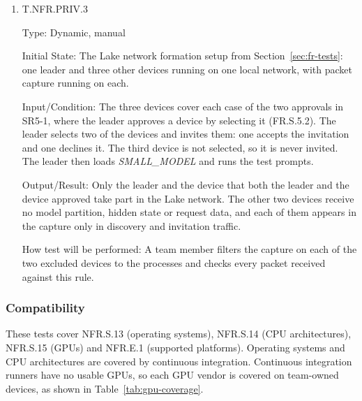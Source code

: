 \documentclass[12pt, titlepage]{article}
\begin{document}
\begin{enumerate}
How test will be performed: A team member captures traffic with
\texttt{tcpdump} on Linux and macOS or Wireshark on Windows, filters it to the
\progname{} processes, and lists every destination address and port.

\item{T.NFR.PRIV.3\\}
\label{T.NFR.PRIV.3}

Type: Dynamic, manual

Initial State: The Lake network formation setup from
Section~\ref{sec:fr-tests}: one leader and three other devices running
\progname{} on one local network, with packet capture running on each.

Input/Condition: The three devices cover each case of the two approvals in
SR5-1, where the leader approves a device by selecting it (FR.S.5.2). The
leader selects two of the devices and invites them: one accepts the invitation
and one declines it. The third device is not selected, so it is never invited.
The leader then loads \textit{SMALL\_MODEL} and runs the test prompts.

Output/Result: Only the leader and the device that both the leader and the
device approved take part in the Lake network. The other two devices receive
no model partition, hidden state or request data, and each of them appears in
the capture only in discovery and invitation traffic.

How test will be performed: A team member filters the capture on each of the
two excluded devices to the \progname{} processes and checks every packet
received against this rule.

\end{enumerate}

\subsubsection{Compatibility}

These tests cover NFR.S.13 (operating systems), NFR.S.14 (CPU architectures),
NFR.S.15 (GPUs) and NFR.E.1 (supported platforms). Operating systems and CPU
architectures are covered by continuous integration. Continuous integration
runners have no usable GPUs, so each GPU vendor is covered on team-owned
devices, as shown in Table~\ref{tab:gpu-coverage}.
\end{document}
